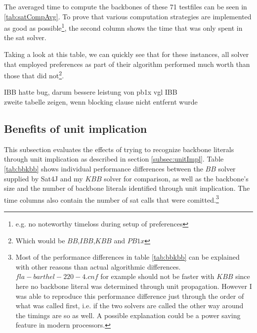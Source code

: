 The averaged time to compute the backbones of these 71 testfiles can be seen in \ref{tab:satCompAvg}. To prove that various computation strategies are implemented as good as possible\footnote{e.g. no noteworthy timeloss during setup of preferences}, the second column shows the time that was only spent in the sat solver.

Taking a look at this table, we can quickly see that for these instances, all solver that employed preferences as part of their algorithm performed much worth than those that did not\footnote{Which would be $BB$,$IBB$,$KBB$ and $PB1x$}.

IBB hatte bug, darum bessere leistung von pb1x vgl IBB\\
zweite tabelle zeigen, wenn blocking clause nicht entfernt wurde


\subsection{Benefits of unit implication}

This subsection evaluates the effects of trying to recognize backbone literals through unit implication as described in section \ref{subsec:unitImpl}. Table \ref{tab:bbkbb} shows individual performance differences between the $BB$ solver supplied by Sat4J and my $KBB$ solver for comparison, as well as the backbone's size and the number of backbone literals identified through unit implication. The time columns also contain the number of sat calls that were comitted.\footnote{Most of the performance differences in table \ref{tab:bbkbb} can be explained with other reasons than actual algorithmic differences. $fla-barthel-220-4.cnf$ for example should not be faster with $KBB$ since here no backbone literal was determined through unit propagation. However I was able to reproduce this performance difference just through the order of what was called first, i.e. if the two solvers are called the other way around the timings are so as well. A possible explanation could be a power saving feature in modern processors.}

